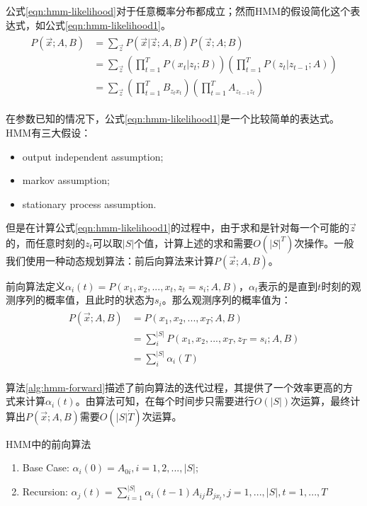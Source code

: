 公式\ref{eqn:hmm-likelihood}对于任意概率分布都成立；然而HMM的假设简化这个表达式，如公式\ref{eqn:hmm-likelihood1}。
\begin{align}
\label{eqn:hmm-likelihood1}
\begin{split}
  P(\vec{x};A,B) &= \sum_{\vec{z}} P(\vec{x}|\vec{z};A,B) P(\vec{z};A;B) \\
                 &= \sum_{\vec{z}} (\prod_{t=1}^{T} P(x_t|z_t; B)) (\prod_{t=1}^{T} P(z_t|z_{t-1};A)) \\
                 &= \sum_{\vec{z}} (\prod_{t=1}^{T} B_{z_{t}x_{t}})(\prod_{t=1}^{T} A_{z_{t-1}z_{t}})
\end{split}
\end{align}

在参数已知的情况下，公式\ref{eqn:hmm-likelihood1}是一个比较简单的表达式。HMM有三大假设：
\begin{itemize}
  \item output independent assumption;
  \item markov assumption;
  \item stationary process assumption.
\end{itemize}

但是在计算公式\ref{eqn:hmm-likelihood1}的过程中，由于求和是针对每一个可能的$\vec{z}$的，而任意时刻的$z_t$可以取$|S|$个值，计算上述的求和需要$O(|S|^{T})$次操作。一般我们使用一种动态规划算法：前后向算法来计算$P(\vec{x};A,B)$。

前向算法定义$\alpha_{i}(t)=P(x_1,x_2,...,x_t,z_t=s_i;A,B)$，$\alpha_t$表示的是直到$t$时刻的观测序列的概率值，且此时的状态为$s_i$。那么观测序列的概率值为：
\begin{align}
\label{eqn:hmm-likelihood2}
\begin{split}
  P(\vec{x};A,B) &= P(x_1,x_2,...,x_T;A,B) \\
                 &= \sum_{i}^{|S|} P(x_1,x_2,...,x_T,z_T=s_i;A,B) \\
                 &= \sum_{i}^{|S|} \alpha_{i}(T)
\end{split}
\end{align}

算法\ref{alg:hmm-forward}描述了前向算法的迭代过程，其提供了一个效率更高的方式来计算$\alpha_{i}(t)$。由算法可知，在每个时间步只需要进行$O(|S|)$次运算，最终计算出$P(\vec{x};A,B)$需要$O(|S|\dot T)$次运算。
\begin{algorithm}
\caption{HMM中的前向算法} 
\label{alg:hmm-forward}
\begin{enumerate}
  \item Base Case: $\alpha_{i}(0) = A_{0i}, i=1,2,...,|S|$;
  \item Recursion: $\alpha_{j}(t) = \sum_{i=1}^{|S|} \alpha_{i}(t-1)A_{ij}B_{jx_{t}}, j = 1,...,|S|, t=1,...,T$
\end{enumerate}
\end{algorithm}

